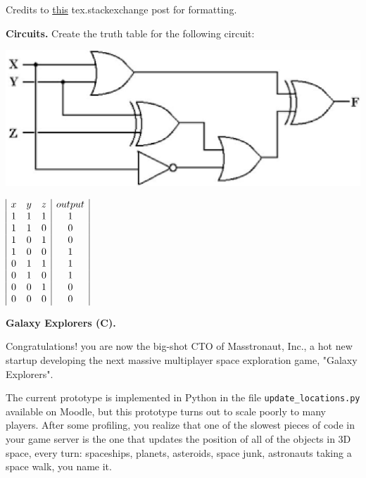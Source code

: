 \documentclass{exam}
\begin{document}
\begin{questions}
Credits to \href{https://tex.stackexchange.com/questions/169842/how-to-make-a-multiply-equation}{this} tex.stackexchange post for formatting.

\question[4]
\textbf{Circuits.}
Create the truth table for the following circuit:
\begin{center}
\includegraphics[width=0.6\textwidth{}]{circut.png}
\end{center}

$\begin{array}{|c c c | c|}
x&y&z&output\\
1&1&1&1\\
1&1&0&0\\
1&0&1&0\\ %
1&0&0&1\\ %
0&1&1&1\\ %
0&1&0&1\\
0&0&1&0\\ %
0&0&0&0
\end{array}$

\question[16]
\textbf{Galaxy Explorers (C).}

Congratulations! you are now the big-shot CTO of Masstronaut, Inc., a hot new startup developing the next massive multiplayer space exploration game, "Galaxy Explorers".

The current prototype is implemented in Python in the file \texttt{update\_locations.py} available on Moodle, 
but this prototype turns out to scale poorly to many players. 
After some profiling, you realize that one of the slowest pieces of code in your game server is the one that updates the position of all of the objects in 3D space, every turn: spaceships, planets, asteroids, space junk, astronauts taking a space walk, you name it. 

\end{questions}
\end{document}
